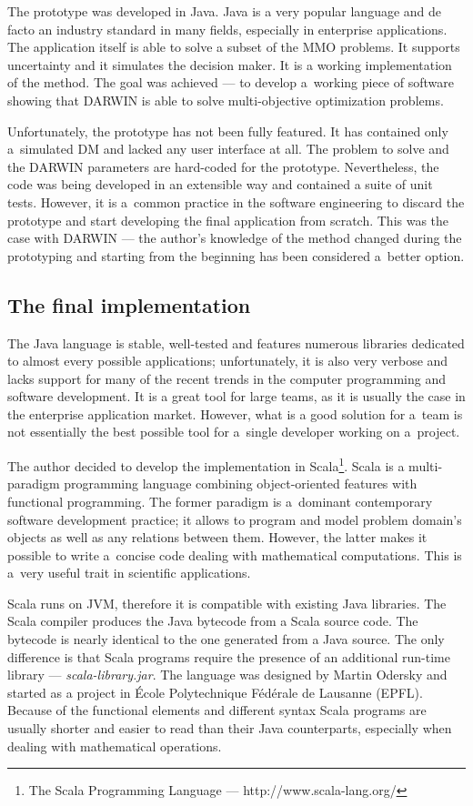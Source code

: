 The prototype was developed in Java. Java is a very popular language and de
facto an industry standard in many fields, especially in enterprise
applications. The application itself is able to solve a subset of the MMO
problems. It supports uncertainty and it simulates the decision maker. It is a
working implementation of the method. The goal was achieved --- to develop
a~working piece of software showing that DARWIN is able to solve
multi-objective optimization problems.

Unfortunately, the prototype has not been fully featured. It has contained
only a~simulated DM and lacked any user interface at all. The problem to solve
and the DARWIN parameters are hard-coded for the prototype. Nevertheless, the
code was being developed in an extensible way and contained a suite of unit
tests. However, it is a~common practice in the software engineering to discard
the prototype and start developing the final application from scratch.  This
was the case with DARWIN --- the author's knowledge of the method changed
during the prototyping and starting from the beginning has been considered
a~better option.

\subsection{The final implementation}
The Java language is stable, well-tested and features numerous libraries
dedicated to almost every possible applications; unfortunately, it is also
very verbose and lacks support for many of the recent trends in the computer
programming and software development. It is a great tool for large teams, as
it is usually the case in the enterprise application market. However, what is
a good solution for a~team is not essentially the best possible tool for
a~single developer working on a~project.

The author decided to develop the implementation in Scala\footnote{The Scala
  Programming Language --- http://www.scala-lang.org/}. Scala is a
multi-paradigm programming language combining object-oriented features with
functional programming. The former paradigm is a~dominant contemporary
software development practice; it allows to program and model problem domain's
objects as well as any relations between them. However, the latter makes it
possible to write a~concise code dealing with mathematical computations. This
is a~very useful trait in scientific applications.

Scala runs on JVM, therefore it is compatible with existing Java
libraries. The Scala compiler produces the Java bytecode from a Scala source
code. The bytecode is nearly identical to the one generated from a Java
source. The only difference is that Scala programs require the presence of an
additional run-time library --- \textit{scala-library.jar}. The language was
designed by Martin Odersky and started as a project in École Polytechnique
Fédérale de Lausanne (EPFL). Because of the functional elements and different
syntax Scala programs are usually shorter and easier to read than their Java
counterparts, especially when dealing with mathematical operations.

